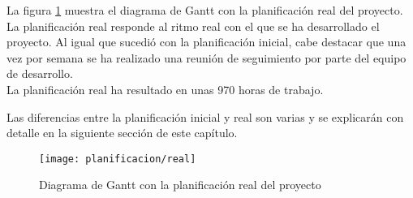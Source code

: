 La figura \ref{fig:gantt_real} muestra el diagrama de Gantt con la planificación real del proyecto.  La planificación real responde al ritmo real con el que se ha desarrollado el proyecto.  Al igual que sucedió con la planificación inicial, cabe destacar que una vez por semana se ha realizado una reunión de seguimiento por parte del equipo de desarrollo.\\
La planificación real ha resultado en unas 970 horas de trabajo.

Las diferencias entre la planificación inicial y real son varias y se explicarán con detalle en la siguiente sección de este capítulo.

\begin{figure}[h]
	\centering
	\texttt{[image: planificacion/real]}
	\caption{Diagrama de Gantt con la planificación real del proyecto}
	\label{fig:gantt_real}
\end{figure}
